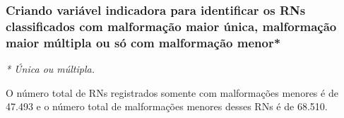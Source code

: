 \documentclass[
]{article}
\begin{document}
\hypertarget{criando-variuxe1vel-indicadora-para-identificar-os-rns-classificados-com-malformauxe7uxe3o-maior-uxfanica-malformauxe7uxe3o-maior-muxfaltipla-ou-suxf3-com-malformauxe7uxe3o-menor}{%
\subsubsection{Criando variável indicadora para identificar os RNs
classificados com malformação maior única, malformação maior múltipla ou
só com malformação
menor*}\label{criando-variuxe1vel-indicadora-para-identificar-os-rns-classificados-com-malformauxe7uxe3o-maior-uxfanica-malformauxe7uxe3o-maior-muxfaltipla-ou-suxf3-com-malformauxe7uxe3o-menor}}

\emph{* Única ou múltipla.}

O número total de RNs registrados somente com malformações menores é de
47.493 e o número total de malformações menores desses RNs é de 68.510.
\end{document}
